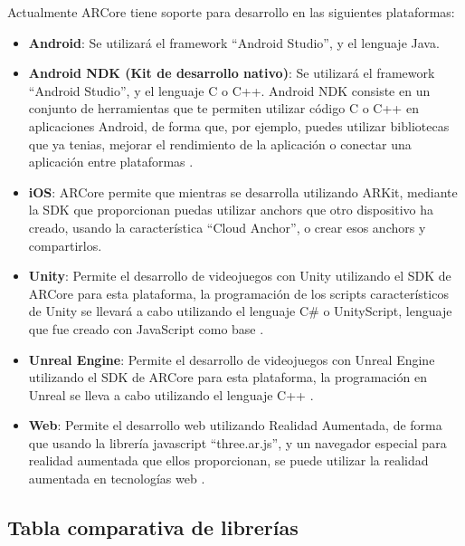 \begin{itemize}
\begin{itemize}
\begin{itemize}
\end{itemize}

Actualmente ARCore tiene soporte para desarrollo en las siguientes plataformas:

\begin{itemize}
  \item \textbf{Android}: Se utilizará el framework “Android Studio”, y el lenguaje Java.

  \item \textbf{Android NDK (Kit de desarrollo nativo)}: Se utilizará el framework “Android Studio”, y el lenguaje C o C++. Android NDK consiste en un conjunto de herramientas que te permiten utilizar código C o C++ en aplicaciones Android, de forma que, por ejemplo, puedes utilizar bibliotecas que ya tenias, mejorar el rendimiento de la aplicación o conectar una aplicación entre plataformas \cite{ndk}.

  \item \textbf{iOS}: ARCore permite que mientras se desarrolla utilizando ARKit, mediante la SDK que proporcionan puedas utilizar anchors que otro dispositivo ha creado, usando la característica “Cloud Anchor”, o crear esos anchors y compartirlos.

  \item \textbf{Unity}: Permite el desarrollo de videojuegos con Unity utilizando el SDK de ARCore para esta plataforma, la programación de los scripts característicos de Unity se llevará a cabo utilizando el lenguaje C# o UnityScript, lenguaje que fue creado con JavaScript como base \cite{unity-scripting}.

  \item \textbf{Unreal Engine}: Permite el desarrollo de videojuegos con Unreal Engine utilizando el SDK de ARCore para esta plataforma, la programación en Unreal se lleva a cabo utilizando el lenguaje C++ \cite{unreal}.

  \item \textbf{Web}: Permite el desarrollo web utilizando Realidad Aumentada, de forma que usando la librería javascript “three.ar.js”, y un navegador especial para realidad aumentada que ellos proporcionan, se puede utilizar la realidad aumentada en tecnologías web \cite{arcore-web}.
\end{itemize}

\subsection{Tabla comparativa de librerías}
\begin{table}[h]
  \begin{center}
    \begin{tabular}{|p{1.5cm}|p{2cm}|p{7cm}|p{2cm}|}


\end{tabular}
\end{center}
\end{table}
\end{itemize}
\end{itemize}
